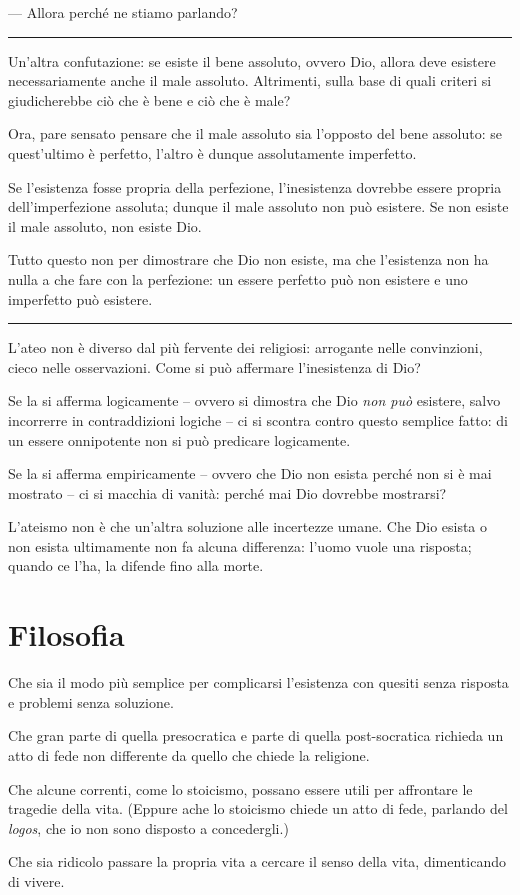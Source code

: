 \documentclass[a4paper,oneside,11pt]{memoir}
\begin{document}
--- Allora perché ne stiamo parlando?

\plainbreak{1}

Un'altra confutazione: se esiste il bene assoluto, ovvero Dio, allora deve
esistere necessariamente anche il male assoluto. Altrimenti, sulla base di quali
criteri si giudicherebbe ciò che è bene e ciò che è male?

Ora, pare sensato pensare che il male assoluto sia l'opposto del bene assoluto:
se quest'ultimo è perfetto, l'altro è dunque assolutamente imperfetto.

Se l'esistenza fosse propria della perfezione, l'inesistenza dovrebbe essere
propria dell'imperfezione assoluta; dunque il male assoluto non può esistere. Se
non esiste il male assoluto, non esiste Dio.

Tutto questo non per dimostrare che Dio non esiste, ma che l'esistenza non ha
nulla a che fare con la perfezione: un essere perfetto può non esistere e uno
imperfetto può esistere.

\plainbreak{1}

L'ateo non è diverso dal più fervente dei religiosi: arrogante nelle
convinzioni, cieco nelle osservazioni. Come si può affermare l'inesistenza di
Dio?

Se la si afferma logicamente -- ovvero si dimostra che Dio \emph{non può}
esistere, salvo incorrerre in contraddizioni logiche -- ci si scontra contro
questo semplice fatto: di un essere onnipotente non si può predicare
logicamente.

Se la si afferma empiricamente -- ovvero che Dio non esista perché non si è mai
mostrato -- ci si macchia di vanità: perché mai Dio dovrebbe mostrarsi?

L'ateismo non è che un'altra soluzione alle incertezze umane. Che Dio esista o
non esista ultimamente non fa alcuna differenza: l'uomo vuole una risposta;
quando ce l'ha, la difende fino alla morte.

\chapter{Filosofia}

Che sia il modo più semplice per complicarsi l'esistenza con quesiti senza
risposta e problemi senza soluzione.

Che gran parte di quella presocratica e parte di quella post-socratica richieda
un atto di fede non differente da quello che chiede la religione.

Che alcune correnti, come lo stoicismo, possano essere utili per affrontare le
tragedie della vita. (Eppure ache lo stoicismo chiede un atto di fede, parlando
del \emph{logos}, che io non sono disposto a concedergli.)

Che sia ridicolo passare la propria vita a cercare il senso della vita,
dimenticando di vivere.

\backmatter

\tableofcontents
\end{document}
